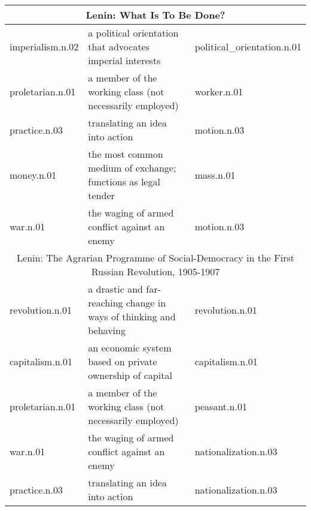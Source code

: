 \begin{table*}[ht]
\begin{tabular}{ p{2.5cm} p{9cm} p{2.5cm}}
    \midrule  \multicolumn{3}{c}{Lenin: What Is To Be Done?} \\  \midrule
    imperialism.n.02 & a political orientation that advocates imperial interests & political\_orientation.n.01\\
    proletarian.n.01 & a member of the working class (not necessarily employed) & worker.n.01\\
    practice.n.03 & translating an idea into action & motion.n.03\\
    money.n.01 & the most common medium of exchange; functions as legal tender & mass.n.01\\
    war.n.01 & the waging of armed conflict against an enemy & motion.n.03\\

    \midrule  \multicolumn{3}{c}{Lenin: The Agrarian Programme of Social-Democracy in the First Russian Revolution, 1905-1907} \\  \midrule
    revolution.n.01 & a drastic and far-reaching change in ways of thinking and behaving & revolution.n.01\\
    capitalism.n.01 & an economic system based on private ownership of capital & capitalism.n.01\\
    proletarian.n.01 & a member of the working class (not necessarily employed) & peasant.n.01\\
    war.n.01 & the waging of armed conflict against an enemy & nationalization.n.03\\
    practice.n.03 & translating an idea into action & nationalization.n.03\\

    \bottomrule
\end{tabular}
\end{table*}

